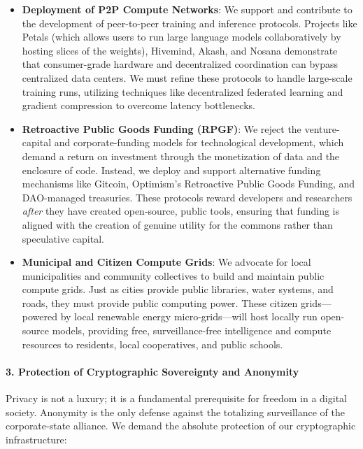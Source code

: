 \begin{itemize}
\tightlist
\item
  \textbf{Deployment of P2P Compute Networks}: We support and contribute
  to the development of peer-to-peer training and inference protocols.
  Projects like Petals (which allows users to run large language models
  collaboratively by hosting slices of the weights), Hivemind, Akash,
  and Nosana demonstrate that consumer-grade hardware and decentralized
  coordination can bypass centralized data centers. We must refine these
  protocols to handle large-scale training runs, utilizing techniques
  like decentralized federated learning and gradient compression to
  overcome latency bottlenecks.
\item
  \textbf{Retroactive Public Goods Funding (RPGF)}: We reject the
  venture-capital and corporate-funding models for technological
  development, which demand a return on investment through the
  monetization of data and the enclosure of code. Instead, we deploy and
  support alternative funding mechanisms like Gitcoin, Optimism's
  Retroactive Public Goods Funding, and DAO-managed treasuries. These
  protocols reward developers and researchers \emph{after} they have
  created open-source, public tools, ensuring that funding is aligned
  with the creation of genuine utility for the commons rather than
  speculative capital.
\item
  \textbf{Municipal and Citizen Compute Grids}: We advocate for local
  municipalities and community collectives to build and maintain public
  compute grids. Just as cities provide public libraries, water systems,
  and roads, they must provide public computing power. These citizen
  grids---powered by local renewable energy micro-grids---will host
  locally run open-source models, providing free, surveillance-free
  intelligence and compute resources to residents, local cooperatives,
  and public schools.
\end{itemize}

\paragraph{3. Protection of Cryptographic Sovereignty and
Anonymity}\label{protection-of-cryptographic-sovereignty-and-anonymity}

Privacy is not a luxury; it is a fundamental prerequisite for freedom in
a digital society. Anonymity is the only defense against the totalizing
surveillance of the corporate-state alliance. We demand the absolute
protection of our cryptographic infrastructure:

